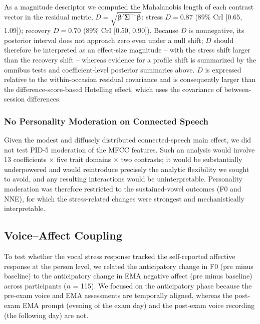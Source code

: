 \documentclass[
  english,
  man,floatsintext]{apa6}
\begin{document}
As a magnitude descriptor we computed the Mahalanobis length of each contrast vector in the residual metric, \(D = \sqrt{\boldsymbol{\beta}' \boldsymbol{\Sigma}^{-1} \boldsymbol{\beta}}\): stress \(D = 0.87\) (89\% CrI {[}0.65, 1.09{]}); recovery \(D = 0.70\) (89\% CrI {[}0.50, 0.90{]}). Because \(D\) is nonnegative, its posterior interval does not approach zero even under a null shift; \(D\) should therefore be interpreted as an effect-size magnitude -- with the stress shift larger than the recovery shift -- whereas evidence for a profile shift is summarized by the omnibus tests and coefficient-level posterior summaries above. \(D\) is expressed relative to the within-occasion residual covariance and is consequently larger than the difference-score-based Hotelling effect, which uses the covariance of between-session differences.

\subsubsection{No Personality Moderation on Connected Speech}\label{no-personality-moderation-on-connected-speech}

Given the modest and diffusely distributed connected-speech main effect, we did not test PID-5 moderation of the MFCC features. Such an analysis would involve 13 coefficients \(\times\) five trait domains \(\times\) two contrasts; it would be substantially underpowered and would reintroduce precisely the analytic flexibility we sought to avoid, and any resulting interactions would be uninterpretable. Personality moderation was therefore restricted to the sustained-vowel outcomes (F0 and NNE), for which the stress-related changes were strongest and mechanistically interpretable.

\subsection{Voice--Affect Coupling}\label{s-voice-affect-coupling}

To test whether the vocal stress response tracked the self-reported affective response at the person level, we related the anticipatory change in F0 (pre minus baseline) to the anticipatory change in EMA negative affect (pre minus baseline) across participants (\(n\) = 115). We focused on the anticipatory phase because the pre-exam voice and EMA assessments are temporally aligned, whereas the post-exam EMA prompt (evening of the exam day) and the post-exam voice recording (the following day) are not.
\end{document}
